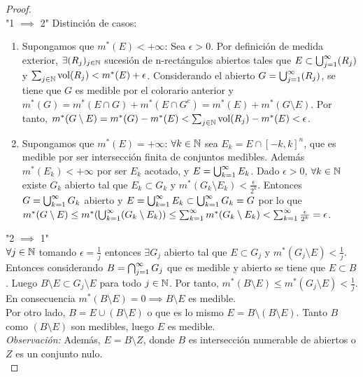 \begin{proof}
    \leavevmode\\
    "1 $\implies$ 2"
    Distinción de casos:
    \begin{enumerate}
        \item Supongamos que $m^*(E) < +\infty$: Sea $\epsilon > 0$. Por definición de medida
              exterior, $\exists (R_j)_{j \in \mathbb{N}}$ sucesión de n-rectángulos abiertos tales
              que $E \subset \bigcup_{j=1}^{\infty}(R_j)$ y $\sum_{j \in \mathbb{N}} \text{vol}(R_j) < m^*(E) +
                  \epsilon$. Considerando el abierto $G = \bigcup_{j=1}^{\infty}(R_j)$, se tiene que $G$ es medible
              por el colorario anterior y $m^*(G) = m^*(E \cap G) + m^*(E \cap G^c) = m^*(E)
                  + m^*(G \setminus E)$. Por tanto, $m^*(G \setminus E) = m^*(G) - m^*(E) <
                  \sum_{j \in \mathbb{N}} \text{vol}(R_j) - m^*(E) < \epsilon$.
        \item Supongamos que $m^*(E) = +\infty$: $\forall k \in \mathbb{N}$ sea $E_k = E \cap
                  [-k,k]^n$, que es medible por ser intersección finita de conjuntos medibles.
              Además $m^*(E_k) < +\infty$ por ser $E_k$ acotado, y $E = \bigcup_{k=1}^{\infty}{E_k}$. Dado
              $\epsilon > 0$, $\forall k \in \mathbb{N}$ existe $G_k$ abierto tal que $E_k \subset
                  G_k$ y $m^*(G_k \setminus E_k) < \frac{\epsilon}{2^k}$. Entonces $G =
                  \bigcup_{k=1}^{\infty}{G_k}$ abierto y $E = \bigcup_{k=1}^{\infty}{E_k} \subset \bigcup_{k=1}^{\infty}{G_k} = G$ por lo que $m^*(G
                  \setminus E) \leq m^*(\bigcup_{k=1}^{\infty}(G_k \setminus E_k)) \leq \sum_{k=1}^{\infty}{m^*(G_k \setminus E_k)}
                  < \sum_{k=1}^{\infty}{\frac{\epsilon}{2^k}} = \epsilon$.
    \end{enumerate}
    "2 $\implies$ 1"\\
    $\forall j \in \mathbb{N}$ tomando $\epsilon = \frac{1}{j}$ entonces $\exists G_j$ abierto tal que $E \subset G_j$ y $m^*(G_j \setminus E) < \frac{1}{j}$. Entonces considerando $B = \bigcap_{j=1}^{\infty}{G_j}$ que es medible y abierto se tiene que $E \subset B$. Luego $B \setminus E \subset G_j \setminus E$ para todo $j \in \mathbb{N}$. Por tanto, $m^*(B \setminus E) \leq m^*(G_j \setminus E) < \frac{1}{j}$. En consecuencia $m^*(B \setminus E) = 0 \implies B \setminus E$ es medible.\\
    Por otro lado, $B = E \cup (B \setminus E)$ o que es lo mismo $E = B \setminus (B \setminus E)$. Tanto $B$ como $(B \setminus E)$ son medibles, luego $E$ es medible.\\
    \textit{Observación:} Además, $E = B \setminus Z$, donde $B$ es intersección numerable de abiertos o $Z$ es un conjunto nulo.\\

\end{proof}
